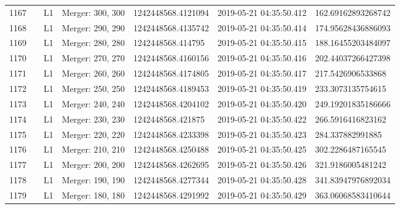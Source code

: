 \begin{longtable}{lllllll}
1167 &                                                    &       L1 &  Merger: 300, 300 &  1242448568.4121094 &  2019-05-21 04:35:50.412 &  162.69162893268742 \\
1168 &                                                    &       L1 &  Merger: 290, 290 &  1242448568.4135742 &  2019-05-21 04:35:50.414 &  174.95628436886093 \\
1169 &                                                    &       L1 &  Merger: 280, 280 &   1242448568.414795 &  2019-05-21 04:35:50.415 &  188.16455203484097 \\
1170 &                                                    &       L1 &  Merger: 270, 270 &  1242448568.4160156 &  2019-05-21 04:35:50.416 &  202.44037266427398 \\
1171 &                                                    &       L1 &  Merger: 260, 260 &  1242448568.4174805 &  2019-05-21 04:35:50.417 &   217.5426906533868 \\
1172 &                                                    &       L1 &  Merger: 250, 250 &  1242448568.4189453 &  2019-05-21 04:35:50.419 &   233.3073135754615 \\
1173 &                                                    &       L1 &  Merger: 240, 240 &  1242448568.4204102 &  2019-05-21 04:35:50.420 &  249.19201835186666 \\
1174 &                                                    &       L1 &  Merger: 230, 230 &   1242448568.421875 &  2019-05-21 04:35:50.422 &   266.5916416823162 \\
1175 &                                                    &       L1 &  Merger: 220, 220 &  1242448568.4233398 &  2019-05-21 04:35:50.423 &    284.337882991885 \\
1176 &                                                    &       L1 &  Merger: 210, 210 &  1242448568.4250488 &  2019-05-21 04:35:50.425 &   302.2286487165545 \\
1177 &                                                    &       L1 &  Merger: 200, 200 &  1242448568.4262695 &  2019-05-21 04:35:50.426 &   321.9186005481242 \\
1178 &                                                    &       L1 &  Merger: 190, 190 &  1242448568.4277344 &  2019-05-21 04:35:50.428 &  341.83947976892034 \\
1179 &                                                    &       L1 &  Merger: 180, 180 &  1242448568.4291992 &  2019-05-21 04:35:50.429 &  363.06068583410644 \\

\end{longtable}
